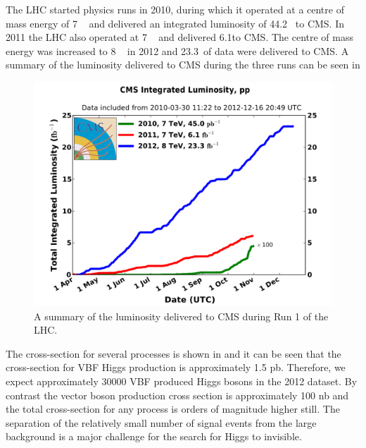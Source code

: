 The LHC started physics runs in 2010, during which it operated at a centre of mass energy of 7 \TeV~ and delivered an integrated luminosity of 44.2 \invpb ~to CMS. In 2011 the LHC also operated at 7 \TeV~ and delivered 6.1\invfb to CMS. The centre of mass energy was increased to 8 \TeV~ in 2012 and 23.3\invfb~of data were delivered to CMS. A summary of the luminosity delivered to CMS during the three runs can be seen in   %

\begin{figure}
  \includegraphics[width=1.2\largefigwidth]{plots/detector/int_lumi_cumulative_pp_2.pdf}
  \caption{A summary of the luminosity delivered to CMS during Run 1 of the LHC.\cite{CMSLumiPublic}}
  \label{fig:lumisummary}
\end{figure}

The cross-section for several processes is shown in  and it can be seen that the cross-section for VBF Higgs production is approximately 1.5 pb. Therefore, we expect approximately 30000 VBF produced Higgs bosons in the 2012 dataset. By contrast the vector boson production cross section is approximately 100 nb and the total cross-section for any process is orders of magnitude higher still. The separation of the relatively small number of signal events from the large background is a major challenge for the search for Higgs to invisible.


